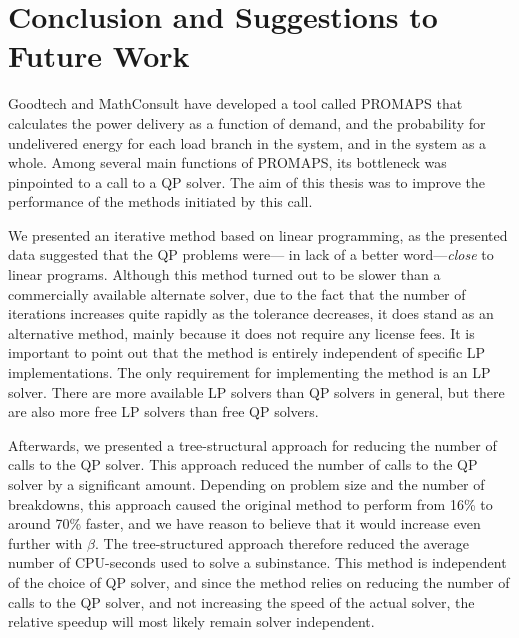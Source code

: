 \documentclass[a4paper,12pt]{report}
\begin{document}







\chapter{Conclusion and Suggestions to Future Work}
Goodtech and MathConsult have developed a tool called PROMAPS that calculates
the power delivery as a function of demand, and the probability for undelivered
energy for each load branch in the system, and in the system as a whole.
Among several main functions of PROMAPS, its bottleneck was pinpointed to
a call to a QP solver. The aim of this thesis was to improve the performance
of the methods initiated by this call.

We presented an iterative method based on linear programming, as the
presented data suggested that the QP problems were--- in lack of a better
word---\emph{close} to linear programs. Although this method turned out to be
slower than a commercially available alternate solver, due to the fact that the
number of iterations increases quite rapidly as the tolerance decreases, it
does stand as an alternative method, mainly because it does not require
any license fees.
It is important
to point out that the method is entirely independent of specific LP
implementations. The only requirement for implementing the method is an LP
solver. There are more available LP solvers than QP solvers in general,
but there are also more free LP solvers than free QP
solvers\cite{wikilp}\cite{wikiqp}.

Afterwards, we presented a tree-structural approach for reducing the number
of calls to the QP solver. This approach reduced the number of calls to the
QP solver by a significant amount. Depending on problem size and the number
of breakdowns, this approach caused the original method to perform from
16\% to around 70\% faster, and we have reason to believe that it would
increase even further with $\beta$.
The tree-structured approach therefore reduced the average number of
CPU-seconds used to solve a subinstance.
This method is
independent of the choice of QP solver, and since the method relies on reducing
the number of calls to the QP solver, and not increasing the speed of the
actual solver, the relative speedup will most likely remain solver independent.
\end{document}
